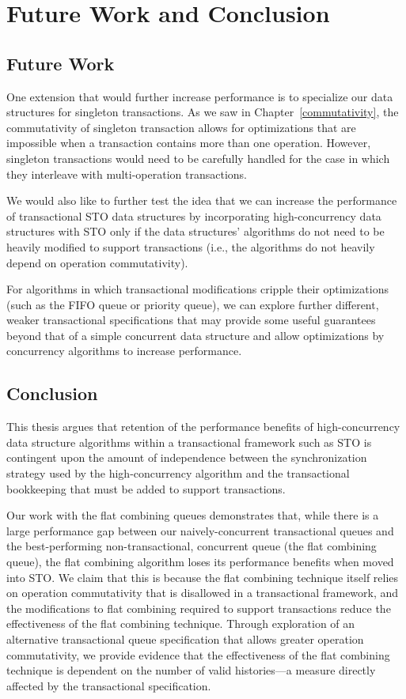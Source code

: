 \chapter{Future Work and Conclusion}

\section{Future Work}
One extension that would further increase performance is to specialize our data structures for singleton transactions. As we saw in Chapter~\ref{commutativity}, the commutativity of singleton transaction allows for optimizations that are impossible when a transaction contains more than one operation. However, singleton transactions would need to be carefully handled for the case in which they interleave with multi-operation transactions. 

We would also like to further test the idea that we can increase the performance of transactional STO data structures by incorporating high-concurrency data structures with STO only if the data structures' algorithms do not need to be heavily modified to support transactions (i.e., the algorithms do not heavily depend on operation commutativity).

For algorithms in which transactional modifications cripple their optimizations (such as the FIFO queue or priority queue), we can explore further different, weaker transactional specifications that may provide some useful guarantees beyond that of a simple concurrent data structure and allow optimizations by concurrency algorithms to increase performance.

\section{Conclusion}
This thesis argues that retention of the performance benefits of high-concurrency data structure algorithms within a transactional framework such as STO is contingent upon the amount of independence between the synchronization strategy used by the high-concurrency algorithm and the transactional bookkeeping that must be added to support transactions.

Our work with the flat combining queues demonstrates that, while there is a large performance gap between our naively-concurrent transactional queues and the best-performing non-transactional, concurrent queue (the flat combining queue), the flat combining algorithm loses its performance benefits when moved into STO. We claim that this is because the flat combining technique itself relies on operation commutativity that is disallowed in a transactional framework, and the modifications to flat combining required to support transactions reduce the effectiveness of the flat combining technique. Through exploration of an alternative transactional queue specification that allows greater operation commutativity, we provide evidence that the effectiveness of the flat combining technique is dependent on the number of valid histories---a measure directly affected by the transactional specification.

